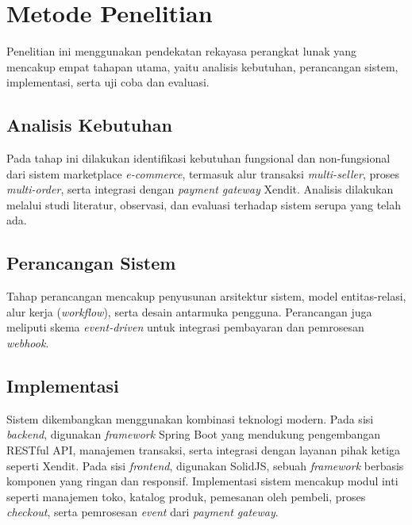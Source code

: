 \documentclass[12pt,a4paper,twocolumn]{article}
\begin{document}
\section{Metode Penelitian}

Penelitian ini menggunakan pendekatan rekayasa perangkat lunak yang mencakup empat tahapan utama, yaitu analisis kebutuhan, perancangan sistem, implementasi, serta uji coba dan evaluasi.

\subsection{Analisis Kebutuhan}

Pada tahap ini dilakukan identifikasi kebutuhan fungsional dan non-fungsional dari sistem marketplace \textit{e-commerce}, termasuk alur transaksi \textit{multi-seller}, proses \textit{multi-order}, serta integrasi dengan \textit{payment gateway} Xendit. Analisis dilakukan melalui studi literatur, observasi, dan evaluasi terhadap sistem serupa yang telah ada.

\subsection{Perancangan Sistem}

Tahap perancangan mencakup penyusunan arsitektur sistem, model entitas-relasi, alur kerja (\textit{workflow}), serta desain antarmuka pengguna. Perancangan juga meliputi skema \textit{event-driven} untuk integrasi pembayaran dan pemrosesan \textit{webhook}.

\subsection{Implementasi}

Sistem dikembangkan menggunakan kombinasi teknologi modern. Pada sisi \textit{backend}, digunakan \textit{framework} Spring Boot yang mendukung pengembangan RESTful API, manajemen transaksi, serta integrasi dengan layanan pihak ketiga seperti Xendit. Pada sisi \textit{frontend}, digunakan SolidJS, sebuah \textit{framework} berbasis komponen yang ringan dan responsif. Implementasi sistem mencakup modul inti seperti manajemen toko, katalog produk, pemesanan oleh pembeli, proses \textit{checkout}, serta pemrosesan \textit{event} dari \textit{payment gateway}.
\end{document}
